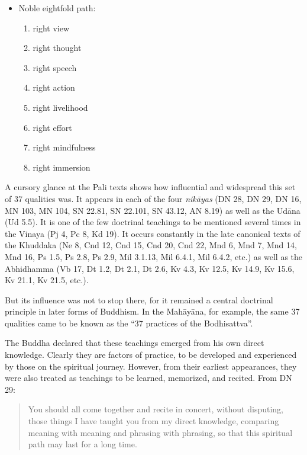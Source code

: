 \documentclass[12pt,openany]{book}%
\begin{document}
\begin{itemize}
%
\item Noble eightfold path:
\begin{enumerate}%
\item right view%
\item right thought%
\item right speech%
\item right action%
\item right livelihood%
\item right effort%
\item right mindfulness%
\item right immersion%
\end{enumerate}

%
\end{itemize}

A cursory glance at the Pali texts shows how influential and widespread this set of 37 qualities was. It appears in each of the four \textit{\textsanskrit{nikāyas}} (DN 28, DN 29, DN 16, MN 103, MN 104, SN 22.81, SN 22.101, SN 43.12, AN 8.19) as well as the \textsanskrit{Udāna} (Ud 5.5). It is one of the few doctrinal teachings to be mentioned several times in the Vinaya (Pj 4, Pc 8, Kd 19). It occurs constantly in the late canonical texts of the Khuddaka (Ne 8, Cnd 12, Cnd 15, Cnd 20, Cnd 22, Mnd 6, Mnd 7, Mnd 14, Mnd 16, Ps 1.5, Ps 2.8, Ps 2.9, Mil 3.1.13, Mil 6.4.1, Mil 6.4.2, etc.) as well as the Abhidhamma (Vb 17, Dt 1.2, Dt 2.1, Dt 2.6, Kv 4.3, Kv 12.5, Kv 14.9, Kv 15.6, Kv 21.1, Kv 21.5, etc.).

But its influence was not to stop there, for it remained a central doctrinal principle in later forms of Buddhism. In the \textsanskrit{Mahāyāna}, for example, the same 37 qualities came to be known as the “37 practices of the Bodhisattva”.

The Buddha declared that these teachings emerged from his own direct knowledge. Clearly they are factors of practice, to be developed and experienced by those on the spiritual journey. However, from their earliest appearances, they were also treated as teachings to be learned, memorized, and recited. From DN 29:

\begin{quotation}%
You should all come together and recite in concert, without disputing, those things I have taught you from my direct knowledge, comparing meaning with meaning and phrasing with phrasing, so that this spiritual path may last for a long time.

%
\end{quotation}
\end{document}

